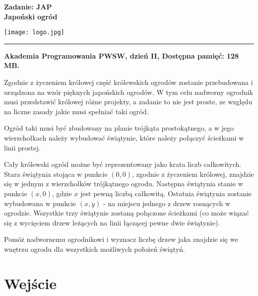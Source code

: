 \documentclass[10pt]{article}
\begin{document}
    

    \noindent
    \begin{minipage}{0.5\textwidth}
        \LARGE{\textsf{\textbf{Zadanie: JAP\\Japoński ogród}}}
    \end{minipage}
    \begin{minipage}{0.5\textwidth}
        \begin{flushright}
            \texttt{[image: logo.jpg]}
        \end{flushright}
    \end{minipage}
    
    \noindent\rule{\textwidth}{0.4pt}
    
    \noindent\textbf{Akademia Programowania PWSW, dzień II, Dostępna pamięć: 128 MB.}
    \vspace{1em}
    
    
    \noindent
    Zgodnie z życzeniem królowej część królewskich ogrodów zostanie przebudowana i urządzona na wzór pięknych japońskich ogrodów. W tym celu nadworny ogrodnik musi przedstawić królowej różne projekty, a zadanie to nie jest proste, ze względu na liczne zasady jakie musi spełniać taki ogród. 
    
    Ogród taki musi być zbudowany na planie trójkąta prostokątnego, a w jego wierzchołkach należy wybudować świątynie, które należy połączyć ścieżkami w linii prostej.
    
    Cały królewski ogród możne być reprezentowany jako krata liczb całkowitych. Stara świątynia stojąca w punkcie $(0, 0)$, zgodnie z życzeniem królowej, znajdzie się w jednym z wierzchołków trójkątnego ogrodu. Następna świątynia stanie w punkcie $(x, 0)$, gdzie $x$ jest pewną liczbą całkowitą. Ostatnia świątynia zostanie wybudowana w punkcie $(x, y)$ - na miejscu jednego z drzew rosnących w ogrodzie. Wszystkie trzy świątynie zostaną połączone ścieżkami (co może wiązać się z wycięciem drzew leżących na linii łączącej pewne dwie świątynie).
    
    Pomóż nadwornemu ogrodnikowi i wyznacz liczbę drzew jaka znajdzie się we wnętrzu ogrodu dla wszystkich możliwych położeń świątyń.


    \section*{Wejście}
    
\end{document}
